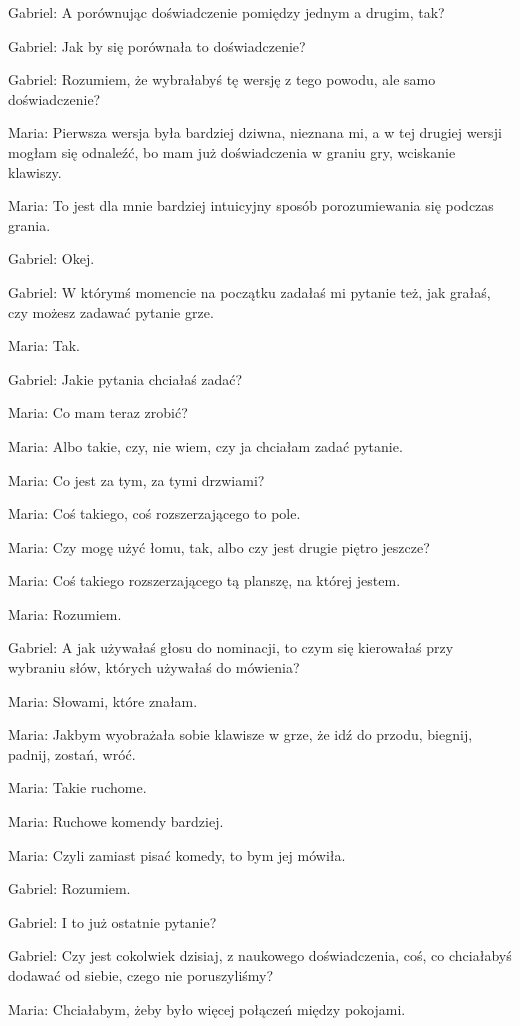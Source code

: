 Gabriel: A porównując doświadczenie pomiędzy jednym a drugim, tak?

Gabriel: Jak by się porównała to doświadczenie?

Gabriel: Rozumiem, że wybrałabyś tę wersję z tego powodu, ale samo doświadczenie?

Maria: Pierwsza wersja była bardziej dziwna, nieznana mi, a w tej drugiej wersji mogłam się odnaleźć, bo mam już doświadczenia w graniu gry, wciskanie klawiszy.

Maria: To jest dla mnie bardziej intuicyjny sposób porozumiewania się podczas grania.

Gabriel: Okej.

Gabriel: W którymś momencie na początku zadałaś mi pytanie też, jak grałaś, czy możesz zadawać pytanie grze.

Maria: Tak.

Gabriel: Jakie pytania chciałaś zadać?

Maria: Co mam teraz zrobić?

Maria: Albo takie, czy, nie wiem, czy ja chciałam zadać pytanie.

Maria: Co jest za tym, za tymi drzwiami?

Maria: Coś takiego, coś rozszerzającego to pole.

Maria: Czy mogę użyć łomu, tak, albo czy jest drugie piętro jeszcze?

Maria: Coś takiego rozszerzającego tą planszę, na której jestem.

Maria: Rozumiem.

Gabriel: A jak używałaś głosu do nominacji, to czym się kierowałaś przy wybraniu słów, których używałaś do mówienia?

Maria: Słowami, które znałam.

Maria: Jakbym wyobrażała sobie klawisze w grze, że idź do przodu, biegnij, padnij, zostań, wróć.

Maria: Takie ruchome.

Maria: Ruchowe komendy bardziej.

Maria: Czyli zamiast pisać komedy, to bym jej mówiła.

Gabriel: Rozumiem.

Gabriel: I to już ostatnie pytanie?

Gabriel: Czy jest cokolwiek dzisiaj, z naukowego doświadczenia, coś, co chciałabyś dodawać od siebie, czego nie poruszyliśmy?

Maria: Chciałabym, żeby było więcej połączeń między pokojami.

